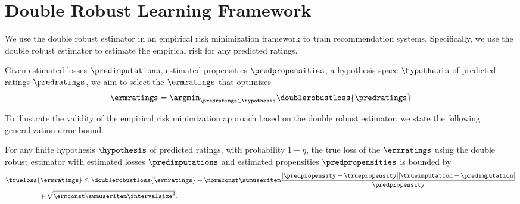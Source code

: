 \section{Double Robust Learning Framework} \label{sec:dobule robust learning framework}
We use the double robust estimator in an empirical risk minimization framework to train recommendation systems.
Specifically, we use the double robust estimator to estimate the empirical risk for any predicted ratings.
\begin{definition}
Given estimated losses $\predimputations$, estimated propensities $\predpropensities$, a hypothesis space $\hypothesis$ of predicted ratings $\predratings$, we aim to select the $\ermratings$ that optimizes
\begin{equation}
\ermratings
=
\argmin_{\predratings\in\hypothesis}
\doublerobustloss{\predratings}
\end{equation}%
\end{definition}
To illustrate the validity of the empirical risk minimization approach based on the double robust estimator, we state the following generalization error bound.
\begin{theorem}
For any finite hypothesis $\hypothesis$ of predicted ratings, with probability $1-\eta$, the true loss of the $\ermratings$ using the double robust estimator with estimated losses $\predimputations$ and estimated propensities $\predpropensities$ is bounded by
\begin{equation}
\begin{split}
\raisetag{1.75\baselineskip}
&
\trueloss{\ermratings}
\leq
\doublerobustloss{\ermratings}
+
\normconst\sumuseritem
\frac{|\predpropensity-\truepropensity||\trueimputation-\predimputation|}{\predpropensity}
\\
&
\hspace{1.75cm}
+
\sqrt{\ermconst\sumuseritem\intervalsize^{2}}
\text{.}
\end{split}
\end{equation}%
\end{theorem}
